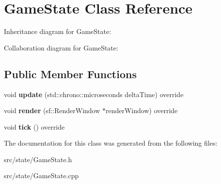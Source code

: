 \hypertarget{classGameState}{\section{Game\-State Class Reference}
\label{classGameState}
}


Inheritance diagram for Game\-State\-:


Collaboration diagram for Game\-State\-:
\subsection*{Public Member Functions}
\begin{DoxyCompactItemize}
\item 
\hypertarget{classGameState_aba059d7ab1a53b8f5d795292ed37abac}{void {\bfseries update} (std\-::chrono\-::microseconds delta\-Time) override}\label{classGameState_aba059d7ab1a53b8f5d795292ed37abac}

\item 
\hypertarget{classGameState_acdfc29603b6075750555fba6ee216907}{void {\bfseries render} (sf\-::\-Render\-Window $\ast$render\-Window) override}\label{classGameState_acdfc29603b6075750555fba6ee216907}

\item 
\hypertarget{classGameState_ae9ff24d75f36ef56daa6a180d4b38a09}{void {\bfseries tick} () override}\label{classGameState_ae9ff24d75f36ef56daa6a180d4b38a09}

\end{DoxyCompactItemize}


The documentation for this class was generated from the following files\-:\begin{DoxyCompactItemize}
\item 
src/state/Game\-State.\-h\item 
src/state/Game\-State.\-cpp\end{DoxyCompactItemize}
